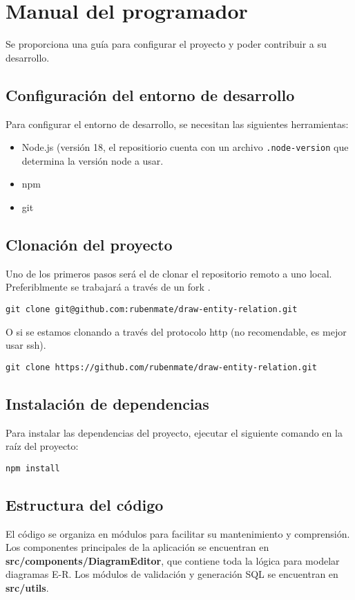 \section{Manual del programador}
Se proporciona una guía para configurar el proyecto y poder contribuir a su desarrollo.

\subsection{Configuración del entorno de desarrollo}
Para configurar el entorno de desarrollo, se necesitan las siguientes herramientas:
\begin{itemize}
    \item Node.js (versión 18, el repositiorio cuenta con un archivo \texttt{.node-version} que determina la versión node a usar.
    \item npm
    \item git
\end{itemize}

\subsection{Clonación del proyecto}
Uno de los primeros pasos será el de clonar el repositorio remoto a uno local. Preferiblmente se trabajará a través de un fork \cite{github:fork}.
\begin{verbatim}
git clone git@github.com:rubenmate/draw-entity-relation.git
\end{verbatim}

O si se estamos clonando a través del protocolo http (no recomendable, es mejor usar ssh).
\begin{verbatim}
git clone https://github.com/rubenmate/draw-entity-relation.git
\end{verbatim}

\subsection{Instalación de dependencias}
Para instalar las dependencias del proyecto, ejecutar el siguiente comando en la raíz del proyecto:
\begin{verbatim}
npm install
\end{verbatim}

\subsection{Estructura del código}
El código se organiza en módulos para facilitar su mantenimiento y comprensión. Los componentes principales de la aplicación se encuentran en  \textbf{src/components/DiagramEditor}, que contiene toda la lógica para modelar diagramas E-R. Los módulos de validación y generación SQL se encuentran en \textbf{src/utils}.

